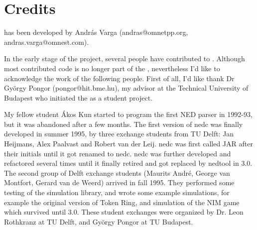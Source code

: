 %
%
%
%
%
%
%
%
%
%
%
%
%
%
%
%
%
%
%
%


\section{Credits}

{\opp} has been developed by Andr\'{a}s Varga (andras@omnetpp.org, andras.varga@omnest.com).

In the early stage of the project, several people have contributed
to {\opp}. Although most contributed code is no longer part of
the {\opp}, nevertheless I'd like to acknowledge the work of the
following people. First of all, I'd like thank Dr Gy\"{o}rgy Pongor
(pongor@hit.bme.hu), my advisor at the Technical University of Budapest
who initiated the {\opp} as a student project.

My fellow student \'{A}kos Kun started to program the first NED parser
in 1992-93, but it was abandoned after a few months.
The first version of nedc was finally developed in summer 1995,
by three exchange students from TU Delft: Jan Heijmans, Alex Paalvast
and Robert van der Leij. nedc was first called JAR after their initials
until it got renamed to nedc. nedc was further developed and refactored
several times until it finally retired and got replaced by nedtool in {\opp} 3.0.
The second group of Delft exchange students (Maurits Andr\'{e},
George van Montfort, Gerard van de Weerd) arrived in fall 1995.
They performed some testing of the simulation library, and
wrote some example simulations, for example the original version
of Token Ring, and simulation of the NIM game which survived until {\opp} 3.0.
These student exchanges were organized by Dr. Leon Rothkranz
at TU Delft, and Gy\"{o}rgy Pongor at TU Budapest.

